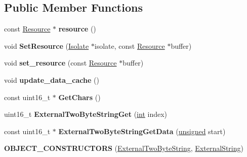 \subsection*{Public Member Functions}
\begin{DoxyCompactItemize}
\item 
\mbox{\label{classv8_1_1internal_1_1ExternalTwoByteString_ab264ae7edf3e8a176f700425292a6b51}} 
const \mbox{\hyperlink{classv8_1_1String_1_1ExternalStringResource}{Resource}} $\ast$ {\bfseries resource} ()
\item 
\mbox{\label{classv8_1_1internal_1_1ExternalTwoByteString_a7a2f4f5ed0093025fca80fb98401fd88}} 
void {\bfseries Set\+Resource} (\mbox{\hyperlink{classv8_1_1internal_1_1Isolate}{Isolate}} $\ast$isolate, const \mbox{\hyperlink{classv8_1_1String_1_1ExternalStringResource}{Resource}} $\ast$buffer)
\item 
\mbox{\label{classv8_1_1internal_1_1ExternalTwoByteString_a672e75f8c2877dca940d6a06ccfb7adf}} 
void {\bfseries set\+\_\+resource} (const \mbox{\hyperlink{classv8_1_1String_1_1ExternalStringResource}{Resource}} $\ast$buffer)
\item 
\mbox{\label{classv8_1_1internal_1_1ExternalTwoByteString_adf35077c4982dd62d5e86d3bb098a8f3}} 
void {\bfseries update\+\_\+data\+\_\+cache} ()
\item 
\mbox{\label{classv8_1_1internal_1_1ExternalTwoByteString_aa22bc19a94d3ee8f88e11a6e7b6302c0}} 
const uint16\+\_\+t $\ast$ {\bfseries Get\+Chars} ()
\item 
\mbox{\label{classv8_1_1internal_1_1ExternalTwoByteString_a0c20e537dbe5a24ae5ef7228291c4d6c}} 
uint16\+\_\+t {\bfseries External\+Two\+Byte\+String\+Get} (\mbox{\hyperlink{classint}{int}} index)
\item 
\mbox{\label{classv8_1_1internal_1_1ExternalTwoByteString_a2d7f982e7a525a42261b0e9696e35991}} 
const uint16\+\_\+t $\ast$ {\bfseries External\+Two\+Byte\+String\+Get\+Data} (\mbox{\hyperlink{classunsigned}{unsigned}} start)
\item 
\mbox{\label{classv8_1_1internal_1_1ExternalTwoByteString_a3f28fbdcb5c7ba2695294cd2f2edec86}} 
{\bfseries O\+B\+J\+E\+C\+T\+\_\+\+C\+O\+N\+S\+T\+R\+U\+C\+T\+O\+RS} (\mbox{\hyperlink{classv8_1_1internal_1_1ExternalTwoByteString}{External\+Two\+Byte\+String}}, \mbox{\hyperlink{classv8_1_1internal_1_1ExternalString}{External\+String}})
\end{DoxyCompactItemize}

